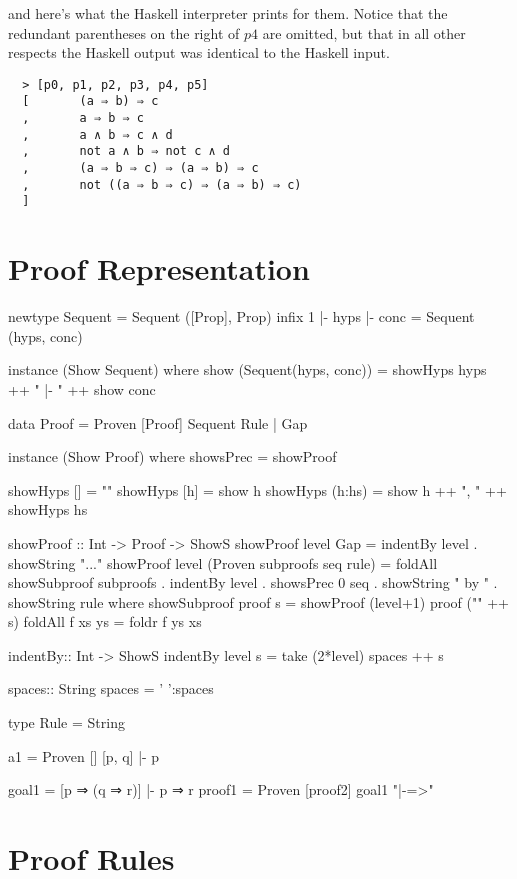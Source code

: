 \documentclass[11pt]{article}
\begin{document}
and here's what the Haskell interpreter prints for them. Notice that the redundant
parentheses on the right of $p4$ are omitted, but that in all other respects 
the Haskell output was identical to the Haskell input.
\begin{verbatim}
  > [p0, p1, p2, p3, p4, p5]
  [       (a ⇒ b) ⇒ c
  ,       a ⇒ b ⇒ c
  ,       a ∧ b ⇒ c ∧ d
  ,       not a ∧ b ⇒ not c ∧ d
  ,       (a ⇒ b ⇒ c) ⇒ (a ⇒ b) ⇒ c
  ,       not ((a ⇒ b ⇒ c) ⇒ (a ⇒ b) ⇒ c)
  ]
\end{verbatim}


\section{Proof Representation}
\begin{code}
  newtype Sequent = Sequent ([Prop], Prop)
  infix 1 |-
  hyps |- conc = Sequent (hyps, conc)
      
  instance (Show Sequent) where 
     show (Sequent(hyps, conc)) = showHyps hyps ++ " |- " ++ show conc
     
  data    Proof   = Proven [Proof] Sequent Rule
                  | Gap
                  
  instance (Show Proof) where
     showsPrec = showProof 
     
  showHyps []     = ""
  showHyps [h]    = show h
  showHyps (h:hs) = show h ++  ", " ++ showHyps hs
  
  showProof :: Int -> Proof -> ShowS
  showProof level Gap = indentBy level . showString "..."
  showProof level (Proven subproofs seq rule) =
            foldAll showSubproof subproofs .
            indentBy level                 .
            showsPrec 0 seq                .
            showString " by "              .
            showString rule
            where 
            showSubproof proof s = showProof (level+1) proof ("\n" ++ s)
            foldAll f xs ys = foldr f ys xs         
                  
  indentBy:: Int -> ShowS
  indentBy level s = take (2*level) spaces ++ s
  
  spaces:: String
  spaces = ' ':spaces 
  
  type Rule = String

  a1 = Proven [] [p, q] |- p
  
  goal1  = [p ⇒ (q ⇒ r)] |- p ⇒ r
  proof1 = Proven [proof2] goal1 "|-=>"

  
\end{code}

\section{Proof Rules}
\end{document}
